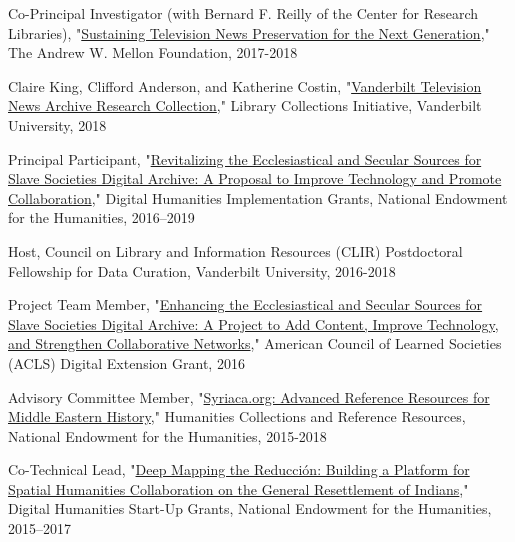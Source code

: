 \documentclass[10pt]{res} %
\begin{document}
\begin{resume}
\begin{hangparas}{.25in}{1}Co-Principal Investigator (with Bernard F. Reilly of the Center for Research Libraries), "\href{https://news.vanderbilt.edu/2017/09/27/workshop-will-chart-the-future-of-television-news-preservation/}{Sustaining Television News Preservation for the Next Generation}," The Andrew W. Mellon Foundation, 2017-2018\end{hangparas}

\begin{hangparas}{.25in}{1}Claire King, Clifford Anderson, and Katherine Costin, "\href{https://news.vanderbilt.edu/2018/05/16/10-faculty-proposals-funded-through-new-library-collections-initiative}{Vanderbilt Television News Archive Research Collection}," Library Collections Initiative, Vanderbilt University, 2018\end{hangparas}

\begin{hangparas}{.25in}{1}Principal Participant, "\href{https://securegrants.neh.gov/publicquery/main.aspx?f=1\&gn=HK-250720-16}{Revitalizing the Ecclesiastical and Secular Sources for Slave Societies Digital Archive: A Proposal to Improve Technology and Promote Collaboration}," Digital Humanities Implementation Grants, National Endowment for the Humanities, 2016–2019\end{hangparas}

\begin{hangparas}{.25in}{1}Host, Council on Library and Information Resources (CLIR) Postdoctoral Fellowship for Data Curation, Vanderbilt University, 2016-2018\end{hangparas}

\begin{hangparas}{.25in}{1}Project Team Member, "\href{http://www.acls.org/research/fellow.aspx?cid=f125fd4b-41a1-e211-b90d-000c29a3451a}{Enhancing the Ecclesiastical and Secular Sources for Slave Societies Digital Archive: A Project to Add Content, Improve Technology, and Strengthen Collaborative Networks}," American Council of Learned Societies (ACLS) Digital Extension Grant, 2016\end{hangparas}

\begin{hangparas}{.25in}{1}Advisory Committee Member, "\href{https://securegrants.neh.gov/PublicQuery/main.aspx?f=1\&gn=PW-228209-15}{Syriaca.org: Advanced Reference Resources for Middle Eastern History}," Humanities Collections and Reference Resources, National Endowment for the Humanities, 2015-2018\end{hangparas}  
\begin{hangparas}{.25in}{1}Co-Technical Lead, "\href{https://securegrants.neh.gov/PublicQuery/main.aspx?f=1\&gn=HD-229071-15}{Deep Mapping the Reducción: Building a Platform for Spatial Humanities Collaboration on the General Resettlement of Indians}," Digital Humanities Start-Up Grants, National Endowment for the Humanities, 2015–2017\end{hangparas} 


\end{resume}
\end{document}
